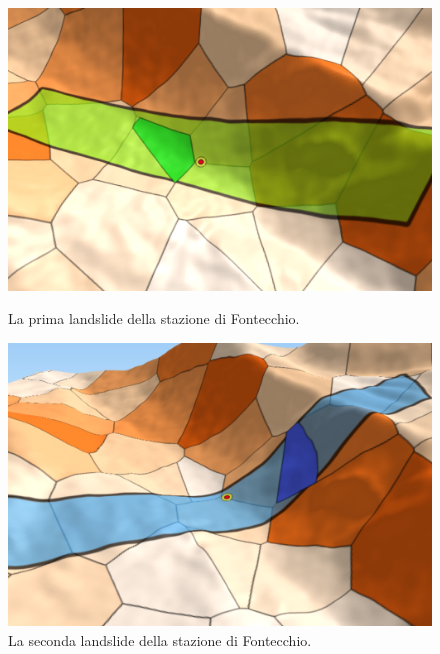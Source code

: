 	\begin{figure}[h]
		\hspace{0.1\linewidth}
		\begin{minipage}[t]{0.35\linewidth}
			\centering
			\includegraphics[width=1\textwidth]{images/FontecchioLandslide1}
			\caption{La prima landslide della stazione di Fontecchio.}
			\label{fontecchiolandslide1}
		\end{minipage}
		\hspace{0.1\linewidth}
		\begin{minipage}[t]{0.35\linewidth}
			\centering
			\includegraphics[width=1\textwidth]{images/FontecchioLandslide2}
			\caption{La seconda landslide della stazione di Fontecchio.}
			\label{fontecchiolandslide2}
		\end{minipage}
	\end{figure}
	
